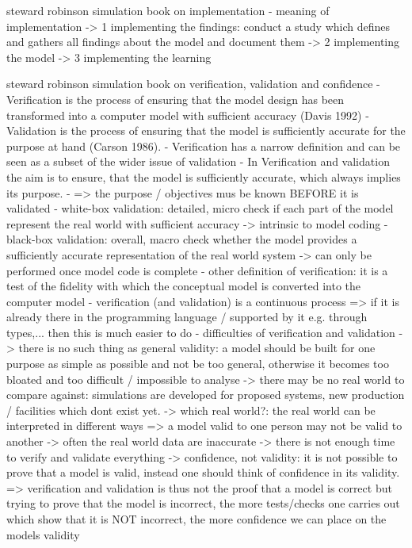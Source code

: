 steward robinson simulation book on implementation
- meaning of implementation
	-> 1 implementing the findings: conduct a study which defines and gathers all findings about the model and document them
	-> 2 implementing the model
	-> 3 implementing the learning

steward robinson simulation book on verification, validation and confidence
- Verification is the process of ensuring that the model design has been transformed into a computer model with sufficient accuracy (Davis 1992)
- Validation is the process of ensuring that the model is sufficiently accurate for the purpose at hand (Carson 1986).
- Verification has a narrow definition and can be seen as a subset of the wider issue of validation
- In Verification and validation the aim is to ensure, that the model is sufficiently accurate, which always implies its purpose.
- => the purpose / objectives mus be known BEFORE it is validated 
- white-box validation: detailed, micro check if each part of the model represent the real world with sufficient accuracy 
	-> intrinsic to model coding
- black-box validation: overall, macro check whether the model provides a sufficiently accurate representation of the real world system
	-> can only be performed once model code is complete
- other definition of verification: it is a test of the fidelity with which the conceptual model is converted into the computer model
- verification (and validation) is a continuous process => if it is already there in the programming language / supported by it e.g. through types,... then this is much easier to do
- difficulties of verification and validation
	-> there is no such thing as general validity: a model should be built for one purpose as simple as possible and not be too general, otherwise it becomes too bloated and too difficult / impossible to analyse
	-> there may be no real world to compare against: simulations are developed for proposed systems, new production / facilities which dont exist yet. 
	-> which real world?: the real world can be interpreted in different ways => a model valid to one person may not be valid to another
	-> often the real world data are inaccurate
	-> there is not enough time to verify and validate everything
	-> confidence, not validity: it is not possible to prove that a model is valid, instead one should think of confidence in its validity. 
		=> verification and validation is thus not the proof that a model is correct but trying to prove that the model is incorrect, the more tests/checks one carries out which show that it is NOT incorrect, the more confidence we can place on the models validity
